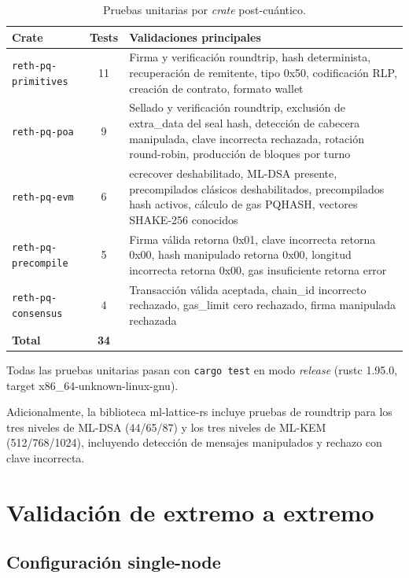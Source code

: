 \begin{table}[htbp]
\centering
\caption{Pruebas unitarias por \emph{crate} post-cuántico.}
\label{tab:unit_tests}
\begin{tabular}{@{}lcL{6cm}@{}}
\toprule
\textbf{Crate} & \textbf{Tests} & \textbf{Validaciones principales} \\
\midrule
\texttt{reth-pq-primitives} & 11 & Firma y verificación roundtrip, hash determinista, recuperación de remitente, tipo 0x50, codificación RLP, creación de contrato, formato wallet \\
\texttt{reth-pq-poa} & 9 & Sellado y verificación roundtrip, exclusión de extra\_data del seal hash, detección de cabecera manipulada, clave incorrecta rechazada, rotación round-robin, producción de bloques por turno \\
\texttt{reth-pq-evm} & 6 & ecrecover deshabilitado, ML-DSA presente, precompilados clásicos deshabilitados, precompilados hash activos, cálculo de gas PQHASH, vectores SHAKE-256 conocidos \\
\texttt{reth-pq-precompile} & 5 & Firma válida retorna 0x01, clave incorrecta retorna 0x00, hash manipulado retorna 0x00, longitud incorrecta retorna 0x00, gas insuficiente retorna error \\
\texttt{reth-pq-consensus} & 4 & Transacción válida aceptada, chain\_id incorrecto rechazado, gas\_limit cero rechazado, firma manipulada rechazada \\
\midrule
\textbf{Total} & \textbf{34} & \\
\bottomrule
\end{tabular}
\end{table}

Todas las pruebas unitarias pasan con \texttt{cargo test} en modo \emph{release} (rustc 1.95.0, target x86\_64-unknown-linux-gnu).

Adicionalmente, la biblioteca ml-lattice-rs incluye pruebas de roundtrip para los tres niveles de ML-DSA (44/65/87) y los tres niveles de ML-KEM (512/768/1024), incluyendo detección de mensajes manipulados y rechazo con clave incorrecta.


\section{Validación de extremo a extremo}
\label{sec:res_e2e}

\subsection{Configuración single-node}

